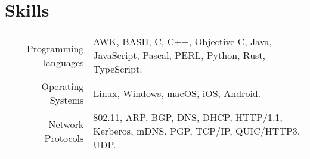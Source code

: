 \documentclass[a4paper,10pt]{article} %
\begin{document}
\section{Skills}

\begin{tabular}{r|p{10cm}}

Programming languages & AWK, BASH, C, C++, Objective-C, Java, JavaScript, Pascal, PERL, Python, Rust, TypeScript.\\
Operating Systems & Linux, Windows, macOS, iOS, Android.\\
Network Protocols & 802.11, ARP, BGP, DNS, DHCP, HTTP/1.1, Kerberos, mDNS, PGP, TCP/IP, QUIC/HTTP3, UDP. 

\end{tabular}

\end{document}
